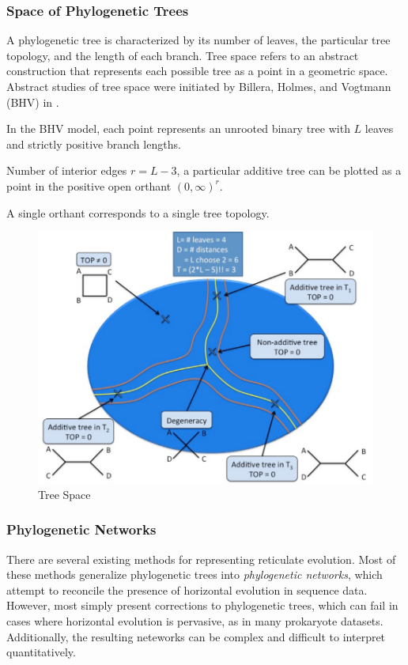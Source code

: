\subsubsection{Space of Phylogenetic Trees}

A phylogenetic tree is characterized by its number of leaves, the particular tree topology, and the length of each branch.
Tree space refers to an abstract construction that represents each possible tree as a point in a geometric space.
Abstract studies of tree space were initiated by Billera, Holmes, and Vogtmann (BHV) in \cite{Billera:2001tv}.

In the BHV model, each point represents an unrooted binary tree with $L$ leaves and strictly positive branch lengths.

Number of interior edges $r=L-3$, a particular additive tree can be plotted as a point in the positive open orthant $(0,\infty)^{r}$.

A single orthant corresponds to a single tree topology.

\begin{figure}
\centering
\includegraphics[]{./fig/TreeSpace.pdf}
\caption{Tree Space}
\label{background:fig:TreeSpace}
\end{figure}

\subsubsection{Phylogenetic Networks}

There are several existing methods for representing reticulate evolution.
Most of these methods generalize phylogenetic trees into \emph{phylogenetic networks}, which attempt to reconcile the presence of horizontal evolution in sequence data.
However, most simply present corrections to phylogenetic trees, which can fail in cases where horizontal evolution is pervasive, as in many prokaryote datasets.
Additionally, the resulting neteworks can be complex and difficult to interpret quantitatively.

